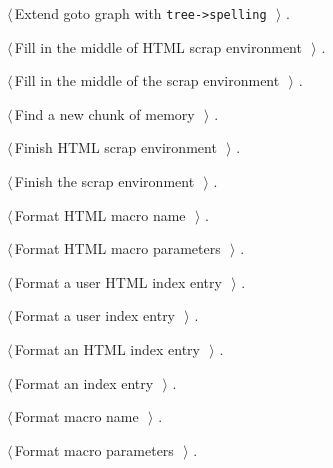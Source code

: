\documentclass{report}
\begin{document}
{\begin{list}{}{\setlength{\itemsep}{-\parsep}\setlength{\itemindent}{-\leftmargin}}
\item $\langle\,$Extend goto graph with \verb|tree->spelling|\nobreak\ {\footnotesize {}}$\,\rangle$ {\footnotesize {\NWtxtRefIn} .}
\item $\langle\,$Fill in the middle of HTML scrap environment\nobreak\ {\footnotesize {}}$\,\rangle$ {\footnotesize {\NWtxtRefIn} .
}
\item $\langle\,$Fill in the middle of the scrap environment\nobreak\ {\footnotesize {}}$\,\rangle$ {\footnotesize {\NWtxtRefIn} .
}
\item $\langle\,$Find a new chunk of memory\nobreak\ {\footnotesize {}}$\,\rangle$ {\footnotesize {\NWtxtRefIn} .}
\item $\langle\,$Finish HTML scrap environment\nobreak\ {\footnotesize {}}$\,\rangle$ {\footnotesize {\NWtxtRefIn} .
}
\item $\langle\,$Finish the scrap environment\nobreak\ {\footnotesize {}}$\,\rangle$ {\footnotesize {\NWtxtRefIn} .
}
\item $\langle\,$Format HTML macro name\nobreak\ {\footnotesize {}}$\,\rangle$ {\footnotesize {\NWtxtRefIn} .}
\item $\langle\,$Format HTML macro parameters\nobreak\ {\footnotesize {}}$\,\rangle$ {\footnotesize {\NWtxtRefIn} .}
\item $\langle\,$Format a user HTML index entry\nobreak\ {\footnotesize {}}$\,\rangle$ {\footnotesize {\NWtxtRefIn} .}
\item $\langle\,$Format a user index entry\nobreak\ {\footnotesize {}}$\,\rangle$ {\footnotesize {\NWtxtRefIn} .}
\item $\langle\,$Format an HTML index entry\nobreak\ {\footnotesize {}}$\,\rangle$ {\footnotesize {\NWtxtRefIn} .}
\item $\langle\,$Format an index entry\nobreak\ {\footnotesize {}}$\,\rangle$ {\footnotesize {\NWtxtRefIn} .}
\item $\langle\,$Format macro name\nobreak\ {\footnotesize {}}$\,\rangle$ {\footnotesize {\NWtxtRefIn} .}
\item $\langle\,$Format macro parameters\nobreak\ {\footnotesize {}}$\,\rangle$ {\footnotesize {\NWtxtRefIn} .}

\end{list}}
\end{document}
